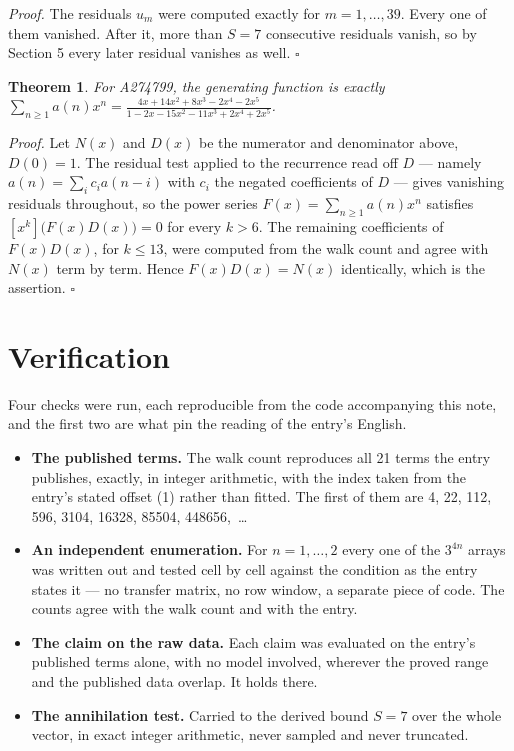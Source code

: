 \documentclass[11pt]{article}
\newtheorem{theorem}{Theorem}
\theoremstyle{definition}
\begin{document}
{\itshape Proof.} The residuals $u_m$ were computed exactly for $m = 1,\dots,39$. Every one of them vanished. After it, more than $S = 7$ consecutive residuals vanish, so by Section 5 every later residual vanishes as well. $\square$

\begin{theorem} For A274799, the generating function is exactly $\sum_{n\ge 1} a(n)x^n = \frac{4x + 14x^{2} + 8x^{3} - 2x^{4} - 2x^{5}}{1 - 2x - 15x^{2} - 11x^{3} + 2x^{4} + 2x^{5}}$.\end{theorem}

{\itshape Proof.} Let $N(x)$ and $D(x)$ be the numerator and denominator above, $D(0)=1$. The residual test applied to the recurrence read off $D$ --- namely $a(n) = \sum_i c_i a(n-i)$ with $c_i$ the negated coefficients of $D$ --- gives vanishing residuals throughout, so the power series $F(x)=\sum_{n\ge 1}a(n)x^n$ satisfies $[x^k]\bigl(F(x)D(x)\bigr) = 0$ for every $k > 6$. The remaining coefficients of $F(x)D(x)$, for $k \le 13$, were computed from the walk count and agree with $N(x)$ term by term. Hence $F(x)D(x) = N(x)$ identically, which is the assertion. $\square$

\section{Verification}

Four checks were run, each reproducible from the code accompanying this note, and the first two are what pin the reading of the entry's English.

\begin{itemize}

\item {\bfseries The published terms.} The walk count reproduces all 21 terms the entry publishes, exactly, in integer arithmetic, with the index taken from the entry's stated offset (1) rather than fitted. The first of them are 4, 22, 112, 596, 3104, 16328, 85504, 448656,~\dots

\item {\bfseries An independent enumeration.} For $n = 1,\dots,2$ every one of the $3^{4n}$ arrays was written out and tested cell by cell against the condition as the entry states it --- no transfer matrix, no row window, a separate piece of code. The counts agree with the walk count and with the entry.

\item {\bfseries The claim on the raw data.} Each claim was evaluated on the entry's published terms alone, with no model involved, wherever the proved range and the published data overlap. It holds there.

\item {\bfseries The annihilation test.} Carried to the derived bound $S = 7$ over the whole vector, in exact integer arithmetic, never sampled and never truncated.

\end{itemize}
\end{document}
